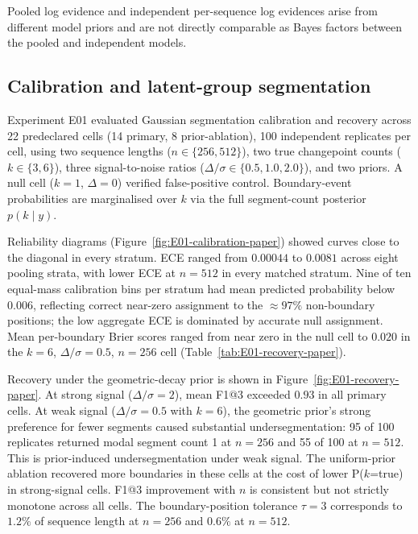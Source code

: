 Pooled log evidence and independent per-sequence log evidences arise from different model priors and are not directly comparable as Bayes factors between the pooled and independent models.





\FloatBarrier
\subsection{Calibration and latent-group segmentation}
Experiment E01 evaluated Gaussian segmentation calibration and recovery across 22 predeclared cells (14 primary, 8 prior-ablation), 100 independent replicates per cell, using two sequence lengths ($n\in\{256,512\}$), two true changepoint counts ($k\in\{3,6\}$), three signal-to-noise ratios ($\Delta/\sigma\in\{0.5,1.0,2.0\}$), and two priors. A null cell ($k=1$, $\Delta=0$) verified false-positive control. Boundary-event probabilities are marginalised over $k$ via the full segment-count posterior $p(k\mid y)$.

Reliability diagrams (Figure~\ref{fig:E01-calibration-paper}) showed curves close to the diagonal in every stratum. ECE ranged from $0.00044$ to $0.0081$ across eight pooling strata, with lower ECE at $n=512$ in every matched stratum. Nine of ten equal-mass calibration bins per stratum had mean predicted probability below $0.006$, reflecting correct near-zero assignment to the $\approx97\%$ non-boundary positions; the low aggregate ECE is dominated by accurate null assignment. Mean per-boundary Brier scores ranged from near zero in the null cell to $0.020$ in the $k=6$, $\Delta/\sigma=0.5$, $n=256$ cell (Table~\ref{tab:E01-recovery-paper}).

Recovery under the geometric-decay prior is shown in Figure~\ref{fig:E01-recovery-paper}. At strong signal ($\Delta/\sigma=2$), mean F1@3 exceeded $0.93$ in all primary cells. At weak signal ($\Delta/\sigma=0.5$ with $k=6$), the geometric prior's strong preference for fewer segments caused substantial undersegmentation: 95 of 100 replicates returned modal segment count 1 at $n=256$ and 55 of 100 at $n=512$. This is prior-induced undersegmentation under weak signal. The uniform-prior ablation recovered more boundaries in these cells at the cost of lower P($k$=true) in strong-signal cells. F1@3 improvement with $n$ is consistent but not strictly monotone across all cells. The boundary-position tolerance $\tau=3$ corresponds to $1.2\%$ of sequence length at $n=256$ and $0.6\%$ at $n=512$.

